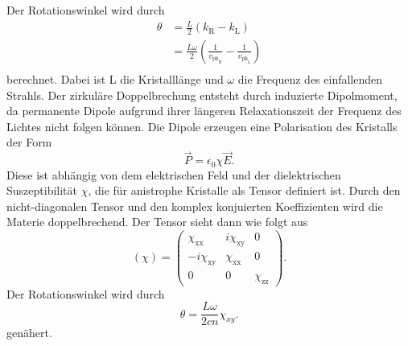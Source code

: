  Der Rotationswinkel wird durch
\begin{align*}
    \theta &=\frac{L}{2} \left(k_{\text{R}}-k_{\text{L}}\right)\\
          &=\frac{L\omega}{2}\left(\frac{1}{v_{\text{ph}_{\text{R}}}}-\frac{1}{v_{\text{ph}_{\text{L}}}}\right)\\
\end{align*}
berechnet. Dabei ist L die Kristalllänge und $\omega$ die Frequenz des einfallenden Strahls. \newline
Der zirkuläre Doppelbrechung entsteht durch induzierte Dipolmoment, da permanente Dipole aufgrund ihrer
längeren Relaxationszeit der Frequenz des Lichtes nicht folgen können. \newline
Die Dipole erzeugen eine Polarisation des Kristalls der Form
\begin{equation*}
    \vec{P} = \epsilon_0 \chi \vec{E}.
\end{equation*}
Diese ist abhängig von dem elektrischen Feld und der dielektrischen Suszeptibilität $\chi$, die für anistrophe
Kristalle als Tensor definiert ist. Durch den nicht-diagonalen Tensor und den komplex konjuierten Koeffizienten
wird die Materie doppelbrechend.\newline
Der Tensor sieht dann wie folgt aus
\begin{equation*}
    ( \chi ) =
    \begin{pmatrix}
      \chi_{\text{xx}} & i\chi_{\text{xy}} & 0 \\
      -i \chi_{\text{xy}}& \chi_{\text{xx}} & 0 \\
      0& 0 & \chi_{\text{zz}}
      \end{pmatrix}.
\end{equation*}
Der Rotationswinkel wird durch
\begin{equation*}
  \theta = \frac{L \omega}{2 c n} \chi_{xy}.
\end{equation*}
genähert.

